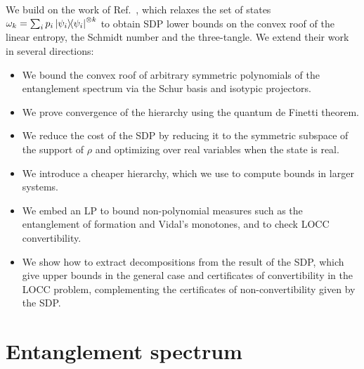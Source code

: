\documentclass[aps,pra,twocolumn,showpacs,superscriptaddress,groupedaddress]{revtex4-2}
\begin{document}
    We build on the work of Ref.~\cite{Toth2015CroofTP}, which relaxes the set of states $\omega_k = \sum_i p_i \dyad{\psi_i}^{\otimes k}$ to obtain SDP lower bounds on the convex roof of the linear entropy, the Schmidt number and the three-tangle. We extend their work in several directions:
    \begin{itemize}
        \item We bound the convex roof of arbitrary symmetric polynomials of the entanglement spectrum via the Schur basis and isotypic projectors.
        \item We prove convergence of the hierarchy using the quantum de Finetti theorem.
        \item We reduce the cost of the SDP by reducing it to the symmetric subspace of the support of $\rho$ and optimizing over real variables when the state is real.
        \item We introduce a cheaper hierarchy, which we use to compute bounds in larger systems.
        \item We embed an LP to bound non-polynomial measures such as the entanglement of formation and Vidal's monotones, and to check LOCC convertibility.
        \item We show how to extract decompositions from the result of the SDP, which give upper bounds in the general case and certificates of convertibility in the LOCC problem, complementing the certificates of non-convertibility given by the SDP.
    \end{itemize}
\fi

\section{Entanglement spectrum}
\end{document}
